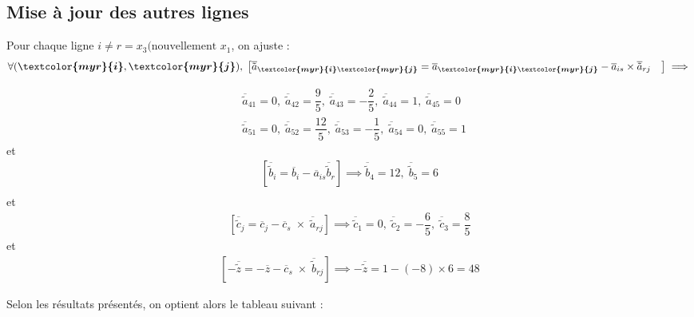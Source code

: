 \documentclass{report}
\begin{document}
\begin{multicols*}{2}
\subsection{Mise à jour des autres lignes}

Pour chaque ligne $i \neq r = x_3 (\text{nouvellement } x_1$, on ajuste :
\begin{align*}
    \forall (\boldsymbol{\textcolor{myr}{i}}, \boldsymbol{\textcolor{myr}{j}}), \; 
    \left[ 
        \overline{\tilde{a}}_{\boldsymbol{\textcolor{myr}{i}\textcolor{myr}{j}}} = 
    \overline{a}_{\boldsymbol{\textcolor{myr}{i}\textcolor{myr}{j}}} -  
    \overline{a}_{is} \times \overline{\tilde{a}}_{rj} \quad
    \right]
    \implies 
\end{align*}
\vspace{-3em} 

\begin{align*}
     &\overline{\tilde{a}}_{41} = 0, \;
     \overline{\tilde{a}}_{42} = \dfrac{9}{5}, \;
     \overline{\tilde{a}}_{43}  = -\dfrac{2}{5}, \;
     \overline{\tilde{a}}_{44} = 1, \;
     \overline{\tilde{a}}_{45} = 0 \\
    &\overline{\tilde{a}}_{51} =   0, \; 
     \overline{\tilde{a}}_{52} =  \dfrac{12}{5}, \;
     \overline{\tilde{a}}_{53} = -\dfrac{1}{5}, \;  
     \overline{\tilde{a}}_{54} = 0, \; 
     \overline{\tilde{a}}_{55} = 1 
\end{align*}                    
et
\begin{align*}
    \left[ \overline{\tilde{b}}_i = \overline{b}_i - \overline{a}_{is} \overline{\tilde{b}}_r \right] 
    \implies
    \overline{\tilde{b}}_4 =  12, \;
    \overline{\tilde{b}}_5 =  6  \\
\end{align*}
et 
\begin{align*}
    \left[ \overline{\tilde{c}}_{j} = 
    \overline{c}_{j} 
- \overline{c}_{s} \; \times \; \overline{\tilde{a}}_{rj}  \right] 
\implies
    \overline{\tilde{c}}_1  = 0 , \; 
    \overline{\tilde{c}}_2 = -\dfrac{6}{5}, \;
    \overline{\tilde{c}}_3 =  \dfrac{8}{5} 
\end{align*}
\vspace{-3em}%
et 
\begin{align*}
    \left[ -\overline{\tilde{z}} = -\overline{z} - \overline{c}_s  \; \times \;
    \overline{\tilde{b}}_{rj} \right] 
    \implies
    -\overline{\tilde{z}} = 1 - (-8) \times 6 = 48
\end{align*}


Selon les résultats présentés, on optient alors le tableau suivant :


\end{multicols*}
\end{document}
